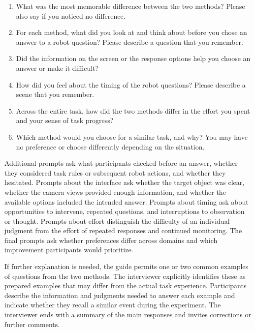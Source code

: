 \begin{enumerate}
\item What was the most memorable difference between the two methods? Please also say if you noticed no difference.
\item For each method, what did you look at and think about before you chose an answer to a robot question? Please describe a question that you remember.
\item Did the information on the screen or the response options help you choose an answer or make it difficult?
\item How did you feel about the timing of the robot questions? Please describe a scene that you remember.
\item Across the entire task, how did the two methods differ in the effort you spent and your sense of task progress?
\item Which method would you choose for a similar task, and why? You may have no preference or choose differently depending on the situation.
\end{enumerate}

Additional prompts ask what participants checked before an answer, whether they considered task rules or subsequent robot actions, and whether they hesitated. Prompts about the interface ask whether the target object was clear, whether the camera views provided enough information, and whether the available options included the intended answer. Prompts about timing ask about opportunities to intervene, repeated questions, and interruptions to observation or thought. Prompts about effort distinguish the difficulty of an individual judgment from the effort of repeated responses and continued monitoring. The final prompts ask whether preferences differ across domains and which improvement participants would prioritize.

If further explanation is needed, the guide permits one or two common examples of questions from the two methods. The interviewer explicitly identifies these as prepared examples that may differ from the actual task experience. Participants describe the information and judgments needed to answer each example and indicate whether they recall a similar event during the experiment. The interviewer ends with a summary of the main responses and invites corrections or further comments.

